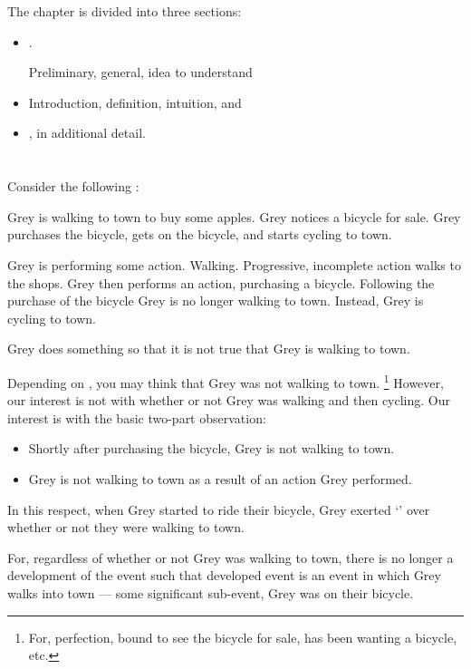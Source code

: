 \begin{note}
  The chapter is divided into three sections:
  \begin{itemize}
  \item

    \ninf{}.

    Preliminary, general, idea to understand 
  \item

    Introduction, definition, intuition, and 
  \item

    \sR{}, in additional detail.
  \end{itemize}
\end{note}

\section{}
\label{cha:requs:sec:infl}

\begin{note}
  Consider the following :

  \begin{scenario}[Apples]
    \label{scen:apples}
    Grey is walking to town to buy some apples.
    Grey notices a bicycle for sale.
    Grey purchases the bicycle, gets on the bicycle, and starts cycling to town.
  \end{scenario}

  Grey is performing some action.
  Walking.
  Progressive, incomplete action walks to the shops.
  Grey then performs an action, purchasing a bicycle.
  Following the purchase of the bicycle Grey is no longer walking to town.
  Instead, Grey is cycling to town.

  Grey does something so that it is not true that Grey is walking to town.

  Depending on , you may think that Grey was not walking to town.%
  \footnote{
    For, perfection, bound to see the bicycle for sale, has been wanting a bicycle, etc.
  }
  However, our interest is not with whether or not Grey was walking and then cycling.
  Our interest is with the basic two-part observation:
  \begin{itemize}[noitemsep]
  \item
    Shortly after purchasing the bicycle, Grey is not walking to town.
  \item
    Grey is not walking to town as a result of an action Grey performed.
  \end{itemize}

  In this respect, when Grey started to ride their bicycle, Grey exerted `\ninf{}' over whether or not they were walking to town.

  For, regardless of whether or not Grey was walking to town, there is no longer a development of the event such that developed event is an event in which Grey walks into town --- some significant sub-event, Grey was on their bicycle.
\end{note}

